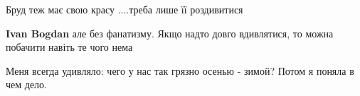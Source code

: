  
 
 
 
 

\qqSecCmt


Бруд теж має свою красу ....треба лише її роздивитися

\textbf{Ivan Bogdan} але без фанатизму. Якщо надто довго вдивлятися, то можна побачити навіть те чого нема 🙂


Меня всегда удивляло: чего у нас так грязно осенью - зимой? Потом я поняла в чем дело.
